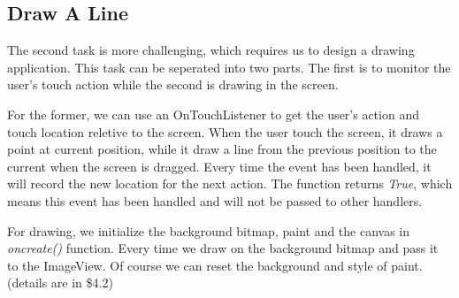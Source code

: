 \documentclass[12pt]{report}
\begin{document}
\subsection{Draw A Line}
The second task is more challenging, which requires us to design a drawing application. This task can be seperated into two parts. The first is to monitor the user's touch action while the second is drawing in the screen.

For the former, we can use an OnTouchListener to get the user's action and touch location reletive to the screen. When the user touch the screen, it draws a point at current position, while it draw a line from the previous position to the current when the screen is dragged. Every time the event has been handled, it will record the new location for the next action. The function returns \textit{True}, which means this event has been handled and will not be passed to other handlers.

For drawing, we initialize the background bitmap, paint and the canvas in \textit{oncreate()} function. Every time we draw on the background bitmap and pass it to the ImageView. Of course we can reset the background and style of paint.(details are in \$4.2)
\end{document}
